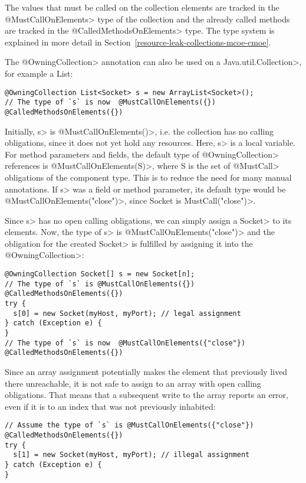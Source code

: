 The values that must be called on the collection elements are tracked in the \<@MustCallOnElements> type of the collection and the already called methods are tracked in the \<@CalledMethodsOnElements> type. The type system is explained in more detail in Section~\ref{resource-leak-collections-mcoe-cmoe}.

The \<@OwningCollection> annotation can also be used on a \<Java.util.Collection>, for example a List:
\begin{Verbatim}
@OwningCollection List<Socket> s = new ArrayList<Socket>();
// The type of `s` is now  @MustCallOnElements({}) @CalledMethodsOnElements({})
\end{Verbatim}

Initially, \<s> is \<@MustCallOnElements({})>, i.e. the collection has no calling obligations, since it does not yet hold any resources. Here, \<s> is a local variable. For method parameters and fields, the default type of \<@OwningCollection> references is \<@MustCallOnElements(S)>, where S is the set of \<@MustCall> obligations of the component type. This is to reduce the need for many manual annotations. If \<s> was a field or method parameter, its default type would be \<@MustCallOnElements({"close"})>, since Socket is \<MustCall("close")>.

Since \<s> has no open calling obligations, we can simply assign a \<Socket> to its elements. Now, the type of \<s> is \<@MustCallOnElements({"close"})> and the obligation for the created \<Socket> is fulfilled by assigning it into the \<@OwningCollection>:

\begin{verbatim}
@OwningCollection Socket[] s = new Socket[n];
// The type of `s` is @MustCallOnElements({}) @CalledMethodsOnElements({})
try {
  s[0] = new Socket(myHost, myPort); // legal assignment
} catch (Exception e) {
}
// The type of `s` is now  @MustCallOnElements({"close"}) @CalledMethodsOnElements({})
\end{verbatim}

Since an array assignment potentially makes the element that previously lived there unreachable, it is not safe to assign to an array with open calling obligations. That means that a subsequent write to the array reports an error, even if it is to an index that was not previously inhabited:

\begin{verbatim}
// Assume the type of `s` is @MustCallOnElements({"close"}) @CalledMethodsOnElements({})
try {
  s[1] = new Socket(myHost, myPort); // illegal assignment
} catch (Exception e) {
}
\end{verbatim}

